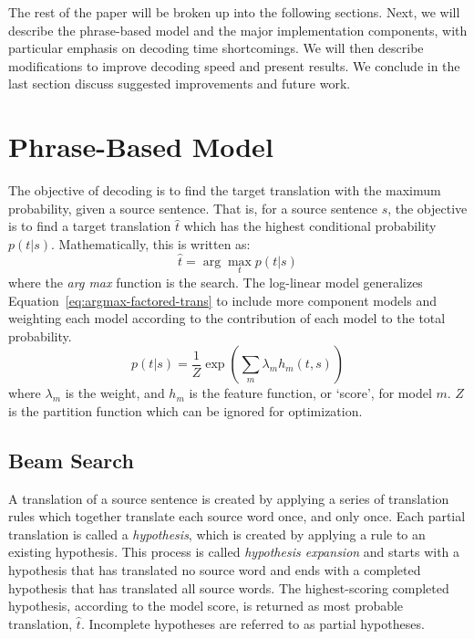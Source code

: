 \documentclass[11pt]{article}
\begin{document}
The rest of the paper will be broken up into the following sections. Next, we will describe the phrase-based model and the major implementation components, with particular emphasis on decoding time shortcomings. We will then describe modifications to improve decoding speed and present results. We conclude in the last section discuss suggested improvements and future work.

\section{Phrase-Based Model}

The objective of decoding is to find the target translation with the maximum probability, given a source sentence. That is, for a source sentence $s$, the objective is to find a target translation $\hat{t}$ which has the highest conditional probability $p(t | s)$. Mathematically, this is written as:
\begin{equation}
\hat{t} = \arg \max_t p( t | s )
\label{eq:argmax-factored-trans}
\end{equation}
where the \emph{arg max} function is the search. The log-linear model generalizes Equation~\ref{eq:argmax-factored-trans} to include more component models and weighting each model according to the contribution of each model to the total probability. 
\begin{equation}
\label{eq:Log-Linear}
p(t | s) 	=  \frac{1}{Z} \exp ( \sum_m \lambda_m h_m ( t, s)^{} )
\end{equation}
where $\lambda_m$ is the weight, and $h_m$ is the feature function, or `score', for model $m$. $Z$ is the partition function which can be ignored for optimization. 

\subsection{Beam Search}

A translation of a source sentence is created by applying a series of translation rules which together translate each source word once, and only once. Each partial translation is called a \emph{hypothesis}, which is created by applying a rule to an existing hypothesis. This process is called \emph{hypothesis expansion} and starts with a hypothesis that has translated no source word and ends with a completed hypothesis that has translated all source words. The highest-scoring completed hypothesis, according to the model score, is returned as  most probable translation, $\hat{t} $. Incomplete hypotheses are referred to as partial hypotheses.
\end{document}
